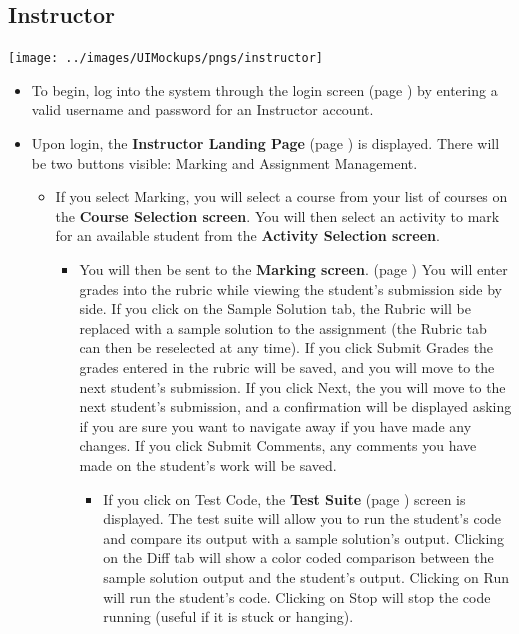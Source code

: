 \documentclass{article}
\begin{document}
\subsection{Instructor}
\centerline{\texttt{[image: ../images/UIMockups/pngs/instructor]}}
\begin{itemize}
  \item To begin, log into the system through the login screen (page \pageref{login})
    by entering a valid username and password for an Instructor account.
  \item Upon login, the \textbf{Instructor Landing Page} (page \pageref{landPg}) 
    is displayed. There will be two buttons visible: Marking and Assignment 
    Management.
    \begin{itemize}
      \item If you select Marking, you will select a course from your list of courses
        on the \textbf{Course Selection screen}. You will then select an activity
        to mark for an available student from the \textbf{Activity Selection screen}.
        \begin{itemize}
        \item You will then be sent to the \textbf{Marking screen}. (page
	  \pageref{marking}) You will enter grades into the rubric while viewing 
	  the student's submission side by side. If you click on the Sample Solution 
	  tab, the Rubric will be replaced with a sample solution to the assignment 
	  (the Rubric tab can then be reselected at any time). If you click Submit 
	  Grades the grades entered in the rubric will be saved, and you will 
	  move to the next student's submission. If you click Next, the you will 
	  move to the next student's submission, and a confirmation will be displayed 
	  asking if you are sure you want to navigate away if you have made any 
	  changes. If you click Submit Comments, any comments you have made 
	  on the student's work will be saved.
	  \begin{itemize}
	    \item If you click on Test Code, the \textbf{Test Suite} (page 
	      \pageref{testSuite}) screen is displayed. The test suite will allow you 
	      to run the student's code and compare its output with a sample 
	      solution's output. Clicking on the Diff tab will show a color coded 
	      comparison between the sample solution output and the student's 
	      output. Clicking on Run will run the student's code. Clicking on Stop 
	      will stop the code running (useful if it is stuck or hanging).
	  \end{itemize}

\end{itemize}
\end{itemize}
\end{itemize}
\end{document}
